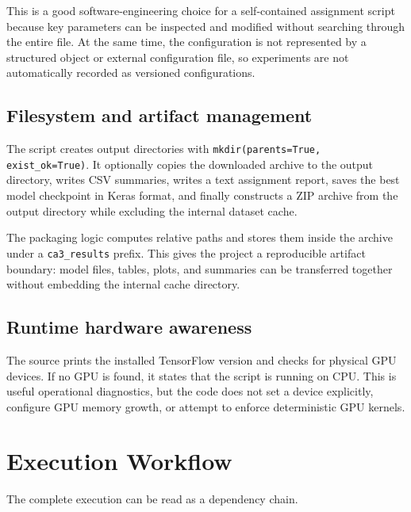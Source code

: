\documentclass[11pt,a4paper]{article}
\newcommand{\code}[1]{\texttt{#1}}
\begin{document}
This is a good software-engineering choice for a self-contained assignment script because key parameters can be inspected and modified without searching through the entire file. At the same time, the configuration is not represented by a structured object or external configuration file, so experiments are not automatically recorded as versioned configurations.

\subsection{Filesystem and artifact management}
The script creates output directories with \code{mkdir(parents=True, exist\_ok=True)}. It optionally copies the downloaded archive to the output directory, writes CSV summaries, writes a text assignment report, saves the best model checkpoint in Keras format, and finally constructs a ZIP archive from the output directory while excluding the internal dataset cache.

The packaging logic computes relative paths and stores them inside the archive under a \code{ca3\_results} prefix. This gives the project a reproducible artifact boundary: model files, tables, plots, and summaries can be transferred together without embedding the internal cache directory.

\subsection{Runtime hardware awareness}
The source prints the installed TensorFlow version and checks for physical GPU devices. If no GPU is found, it states that the script is running on CPU. This is useful operational diagnostics, but the code does not set a device explicitly, configure GPU memory growth, or attempt to enforce deterministic GPU kernels.

\section{Execution Workflow}
The complete execution can be read as a dependency chain.
\end{document}
